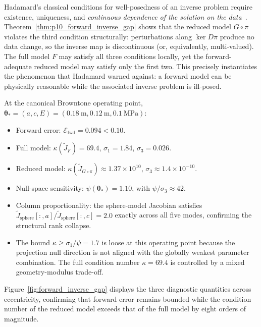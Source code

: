 \begin{remark}
Hadamard's classical conditions for well-posedness of an inverse
problem require existence, uniqueness, and \emph{continuous dependence of
the solution on the data}~\cite{Hadamard1902,Tikhonov1977}.
Theorem~\ref{thm:p10_forward_inverse_gap} shows that the reduced model
$G\circ\pi$ violates the third condition structurally: perturbations along
$\ker D\pi$ produce no data change, so the inverse map is discontinuous
(or, equivalently, multi-valued).  The full model $F$ may satisfy all three
conditions locally, yet the forward-adequate reduced model may satisfy only
the first two.  This precisely instantiates the phenomenon that Hadamard
warned against: a forward model can be physically reasonable while the
associated inverse problem is ill-posed.
\end{remark}

\begin{remark}
At the canonical Browntone operating point,
$\boldsymbol{\theta}_*=(a,c,E)=(\SI{0.18}{\metre},\SI{0.12}{\metre},\SI{0.1}{\mega\pascal})$:
\begin{itemize}
  \item Forward error: $\mathcal{E}_\mathrm{fwd}=0.094<0.10$.
  \item Full model: $\kappa(\widetilde{J}_F)=69.4$,
    $\sigma_1=1.84$, $\sigma_3=0.026$.
  \item Reduced model:
    $\kappa(\widetilde{J}_{G\circ\pi})\approx 1.37\times 10^{10}$,
    $\sigma_3\approx 1.4\times 10^{-10}$.
  \item Null-space sensitivity: $\psi(\boldsymbol{\theta}_*)=1.10$, with
    $\psi/\sigma_3\approx 42$.
  \item Column proportionality: the sphere-model Jacobian satisfies
    $\widetilde{J}_\mathrm{sphere}[:,a]/\widetilde{J}_\mathrm{sphere}[:,c]=2.0$
    exactly across all five modes, confirming the structural rank collapse.
  \item The bound $\kappa\geq\sigma_1/\psi=1.7$ is loose at this operating
    point because the projection null direction is not aligned with the
    globally weakest parameter combination.  The full condition number
    $\kappa=69.4$ is controlled by a mixed geometry-modulus trade-off.
\end{itemize}
Figure~\ref{fig:forward_inverse_gap} displays the three diagnostic
quantities across eccentricity, confirming that forward error remains bounded
while the condition number of the reduced model exceeds that of the full model
by eight orders of magnitude.
\end{remark}

